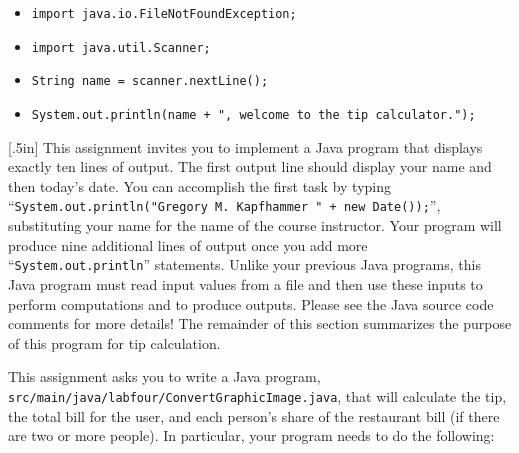 \documentclass[11pt]{article}
\newcommand{\mainprogramsource}{\lstinline{src/main/java/labfour/ConvertGraphicImage.java}}
\newcommand{\command}[1]{``\lstinline{#1}''}
\newcommand{\program}[1]{\lstinline{#1}}
\newcommand{\think}[1]{\null\hfill\LARGE{\faCogs{}}\newline\scriptsize{\em{#1}}}
\begin{document}
\begin{itemize}

  \item \program{import java.io.FileNotFoundException;}
  \item \program{import java.util.Scanner;}
  \item \program{String name = scanner.nextLine();}
  \item \program{System.out.println(name + ", welcome to the tip calculator.");}

\end{itemize}

\marginnote{\think{Research file input}}[.5in] This assignment invites you to
implement a Java program that displays exactly ten lines of output. The first
output line should display your name and then today's date. You can accomplish
the first task by typing \command{System.out.println("Gregory M. Kapfhammer " +
new Date());}, substituting your name for the name of the course instructor.
Your program will produce nine additional lines of output once you add more
\command{System.out.println} statements. Unlike your previous Java programs,
this Java program must read input values from a file and then use these inputs
to perform computations and to produce outputs. Please see the Java source code
comments for more details! The remainder of this section summarizes the purpose
of this program for tip calculation.

This assignment asks you to write a Java program, \mainprogramsource{}, that
will calculate the tip, the total bill for the user, and each person's share of
the restaurant bill (if there are two or more people). In particular, your
program needs to do the following:
\end{document}

